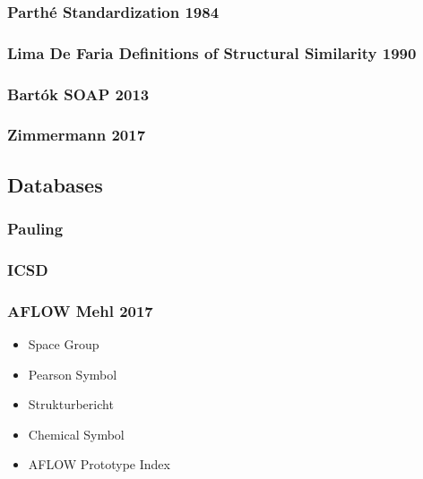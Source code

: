 \documentclass[11pt]{article}
\providecommand{\tightlist}{%
      \setlength{\itemsep}{0pt}\setlength{\parskip}{0pt}}
\begin{document}
    \subsubsection{Parthé Standardization
1984}\label{parthuxe9-standardization-1984}

    \subsubsection{Lima De Faria Definitions of Structural Similarity
1990}\label{lima-de-faria-definitions-of-structural-similarity-1990}

    \subsubsection{Bartók SOAP 2013}\label{bartuxf3k-soap-2013}

    \subsubsection{Zimmermann 2017}\label{zimmermann-2017}

    \subsection{Databases}\label{databases}

    \subsubsection{Pauling}\label{pauling}

    \subsubsection{ICSD}\label{icsd}

    \subsubsection{AFLOW Mehl 2017}\label{aflow-mehl-2017}

\begin{itemize}
\tightlist
\item
  Space Group
\item
  Pearson Symbol
\item
  Strukturbericht
\item
  Chemical Symbol
\item
  AFLOW Prototype Index
\end{itemize}
\end{document}
